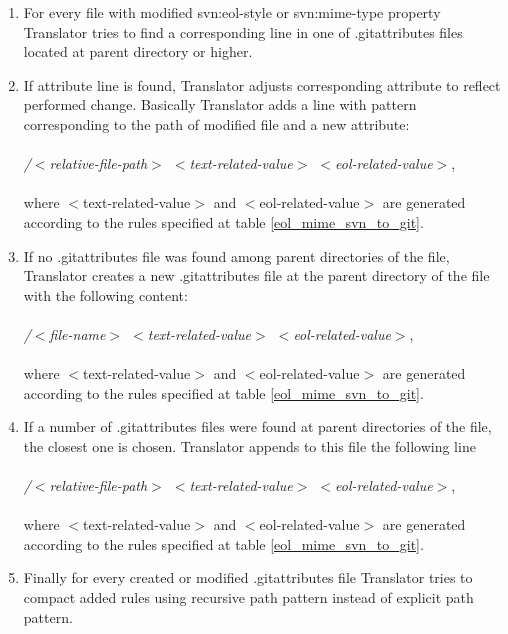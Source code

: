 \begin{enumerate}
\compactlist
\item For every file with modified svn:eol-style or svn:mime-type property Translator tries to find a corresponding line in one of .gitattributes files located at parent directory or higher.\\
	
\item If attribute line is found, Translator adjusts corresponding attribute to reflect performed change. Basically Translator adds a line with pattern corresponding to the path of modified file and a new attribute:\\\\

\emph{/$<$relative-file-path$>$ $<$text-related-value$>$ $<$eol-related-value$>$},\\\\

where $<$text-related-value$>$ and $<$eol-related-value$>$ are generated according to the rules specified at table \ref{eol_mime_svn_to_git}.\\
	
\item If no .gitattributes file was found among parent directories of the file, Translator creates a new .gitattributes file at the parent directory of the file with the following content:\\\\

\emph{/$<$file-name$>$ $<$text-related-value$>$ $<$eol-related-value$>$},\\\\

where $<$text-related-value$>$ and $<$eol-related-value$>$ are generated according to the rules specified at table \ref{eol_mime_svn_to_git}.\\
	
\item If a number of .gitattributes files were found at parent directories of the file, the closest one is chosen. Translator appends to this file the following line\\\\

\emph{/$<$relative-file-path$>$ $<$text-related-value$>$ $<$eol-related-value$>$},\\\\

where $<$text-related-value$>$ and $<$eol-related-value$>$ are generated according to the rules specified at table \ref{eol_mime_svn_to_git}.\\

\item Finally for every created or modified .gitattributes file Translator tries to compact added rules using recursive path pattern instead of explicit path pattern.
\end{enumerate}

